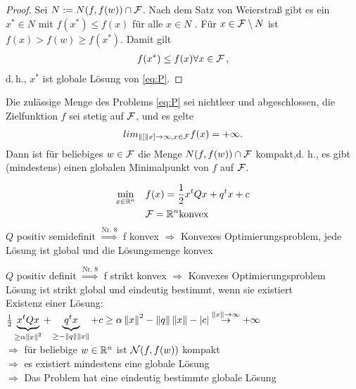 \begin{proof}
Sei $N := N (f, f(w)) \cap \mathcal{F}$. Nach dem Satz von Weierstraß gibt es ein $x^* \in N$ mit $f(x^*) \leq f(x)$ für alle $x \in N$ . Für $x \in \mathcal{F} \setminus N$ ist $f(x) > f(w) \geq f(x^*)$. Damit gilt
\begin{align*}
f (x^*) \leq f(x) \forall x \in \mathcal{F} \,,
\end{align*}
d.\,h., $x^*$ ist globale Lösung von \eqref{eq:P}.
\end{proof}

\begin{Lemma}
Die zulässige Menge des Problems \eqref{eq:P} sei nichtleer und abgeschlossen, die Zielfunktion $f$ sei stetig auf $\mathcal{F}$, und es gelte
\begin{align*}
lim_{\left\lVert[\right\rVert x] \rightarrow \infty, x \in \mathcal{F}} f(x) = + \infty .
\end{align*}
Dann ist für beliebiges $w \in \mathcal{F}$ die Menge $N(f, f(w))\cap \mathcal{F}$ kompakt,d. h., es gibt (mindestens) einen globalen Minimalpunkt von $f$ auf $\mathcal{F}$.
\end{Lemma}

\begin{Beispiel}
	\begin{gather*} 
  			\begin{aligned}
    			\min_{x \in \mathbb R^n}
    			& & & f(x)=\frac{1}{2}x^tQx+q^tx+c \\
    			& & & \mathcal{F}=\mathbb R^n \text{konvex}
  			\end{aligned}
	\end{gather*}
$Q$ positiv semidefinit $\overset{\text{Nr. 8}}\Rightarrow$ f konvex $\Rightarrow$ Konvexes Optimierungsproblem, jede Lösung ist global und die Lösungsmenge konvex

$Q$ positiv definit $\overset{\text{Nr. 8}}\Rightarrow$ f strikt konvex $\Rightarrow$ Konvexes Optimierungsproblem\\
Lösung ist strikt global und eindeutig bestimmt, wenn sie existiert\\
Existenz einer Lösung: $\frac{1}{2}\underbrace{x^tQx}_{\geq\alpha\left\lVert x\right\rVert^2}+\underbrace{q^tx}_{\geq-\left\lVert q\right\rVert\left\lVert x\right\rVert}+c\geq \alpha\left\lVert x\right\rVert^2-\left\lVert q\right\rVert\left\lVert x\right\rVert-|c|\overset{\left\lVert x\right\rVert\rightarrow\infty}{\rightarrow}+\infty$\\
$\Rightarrow$ für beliebige $w\in\mathbb R^n$ ist $\mathcal{N}(f,f(w))$ kompakt\\
$\Rightarrow$ es existiert mindestens eine globale Lösung\\
$\Rightarrow$ Das Problem hat eine eindeutig bestimmte globale Lösung\\
\end{Beispiel}
